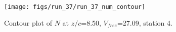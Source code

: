 \begin{figure}[H]
\centering
\texttt{[image: figs/run\_37/run\_37\_num\_contour]}
\caption{Contour plot of $N$ at $z/c$=8.50, $V_{free}$=27.09, station 4.}
\label{fig:run_37_num_contour}
\end{figure}


